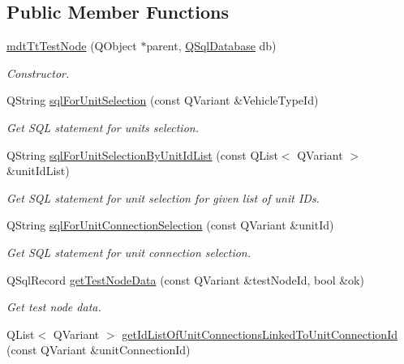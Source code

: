 \subsection*{Public Member Functions}
\begin{DoxyCompactItemize}
\item 
\hyperlink{classmdt_tt_test_node_a6a3513f05c9d76f60d7a27bd26c5ecc3}{mdt\-Tt\-Test\-Node} (Q\-Object $\ast$parent, \hyperlink{class_q_sql_database}{Q\-Sql\-Database} db)
\begin{DoxyCompactList}\small\item\em Constructor. \end{DoxyCompactList}\item 
Q\-String \hyperlink{classmdt_tt_test_node_ae1c4ba44984fb21ec36aa4aa15207ad4}{sql\-For\-Unit\-Selection} (const Q\-Variant \&Vehicle\-Type\-Id)
\begin{DoxyCompactList}\small\item\em Get S\-Q\-L statement for units selection. \end{DoxyCompactList}\item 
Q\-String \hyperlink{classmdt_tt_test_node_a98245190a8c199d1a7238b2d1c557830}{sql\-For\-Unit\-Selection\-By\-Unit\-Id\-List} (const Q\-List$<$ Q\-Variant $>$ \&unit\-Id\-List)
\begin{DoxyCompactList}\small\item\em Get S\-Q\-L statement for unit selection for given list of unit I\-Ds. \end{DoxyCompactList}\item 
Q\-String \hyperlink{classmdt_tt_test_node_a0dcbf96a31c631f8ce62e1526688ba9f}{sql\-For\-Unit\-Connection\-Selection} (const Q\-Variant \&unit\-Id)
\begin{DoxyCompactList}\small\item\em Get S\-Q\-L statement for unit connection selection. \end{DoxyCompactList}\item 
Q\-Sql\-Record \hyperlink{classmdt_tt_test_node_ae4fbcd11c5c65892175c59ddb1cfc074}{get\-Test\-Node\-Data} (const Q\-Variant \&test\-Node\-Id, bool \&ok)
\begin{DoxyCompactList}\small\item\em Get test node data. \end{DoxyCompactList}\item 
Q\-List$<$ Q\-Variant $>$ \hyperlink{classmdt_tt_test_node_a3a0e95628454016a49202dfb7a40e871}{get\-Id\-List\-Of\-Unit\-Connections\-Linked\-To\-Unit\-Connection\-Id} (const Q\-Variant \&unit\-Connection\-Id)

\end{DoxyCompactItemize}
